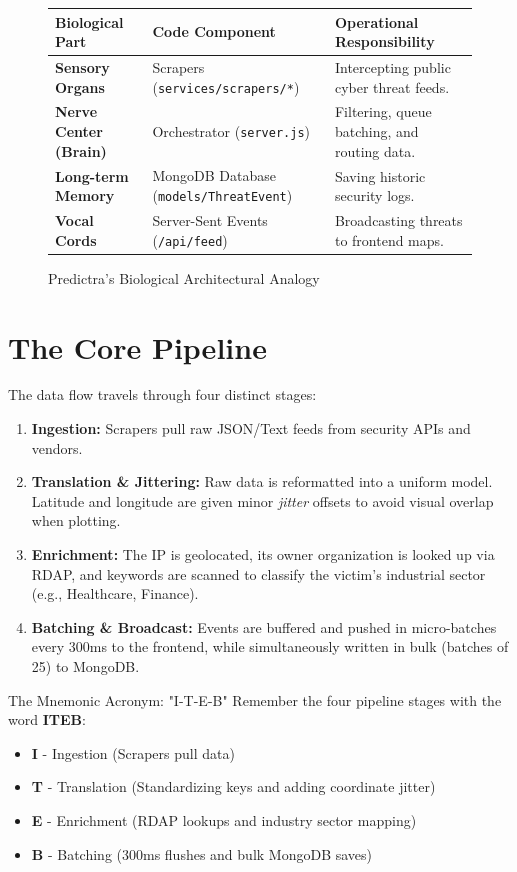 \documentclass[11pt,a4paper]{report}
\begin{document}
\begin{figure}[H]
  \centering
  \small
  \begin{tabular}{|l|l|l|}
    \hline
    \textbf{Biological Part} & \textbf{Code Component} & \textbf{Operational Responsibility} \\ \hline
    \textbf{Sensory Organs} & Scrapers (\texttt{services/scrapers/*}) & Intercepting public cyber threat feeds. \\ \hline
    \textbf{Nerve Center (Brain)} & Orchestrator (\texttt{server.js}) & Filtering, queue batching, and routing data. \\ \hline
    \textbf{Long-term Memory} & MongoDB Database (\texttt{models/ThreatEvent}) & Saving historic security logs. \\ \hline
    \textbf{Vocal Cords} & Server-Sent Events (\texttt{/api/feed}) & Broadcasting threats to frontend maps. \\ \hline
  \end{tabular}
  \caption{Predictra's Biological Architectural Analogy}
\end{figure}

\section{The Core Pipeline}
The data flow travels through four distinct stages:
\begin{enumerate}
  \item \textbf{Ingestion:} Scrapers pull raw JSON/Text feeds from security APIs and vendors.
  \item \textbf{Translation \& Jittering:} Raw data is reformatted into a uniform model. Latitude and longitude are given minor \emph{jitter} offsets to avoid visual overlap when plotting.
  \item \textbf{Enrichment:} The IP is geolocated, its owner organization is looked up via RDAP, and keywords are scanned to classify the victim's industrial sector (e.g., Healthcare, Finance).
  \item \textbf{Batching \& Broadcast:} Events are buffered and pushed in micro-batches every 300ms to the frontend, while simultaneously written in bulk (batches of 25) to MongoDB.
\end{enumerate}

\begin{memoryanchor}{The Mnemonic Acronym: "I-T-E-B"}
  Remember the four pipeline stages with the word \textbf{ITEB}:
  \begin{itemize}
    \item \textbf{I} - Ingestion (Scrapers pull data)
    \item \textbf{T} - Translation (Standardizing keys and adding coordinate jitter)
    \item \textbf{E} - Enrichment (RDAP lookups and industry sector mapping)
    \item \textbf{B} - Batching (300ms flushes and bulk MongoDB saves)
  \end{itemize}
\end{memoryanchor}
\end{document}
